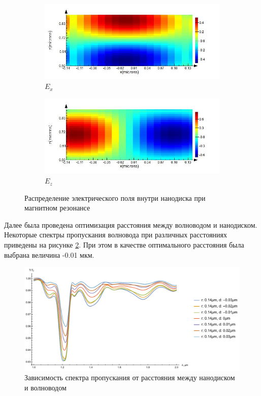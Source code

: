 \begin{figure}[H]
	\begin{subfigure}[b]{.5\textwidth}
		\includegraphics[width=\textwidth]{img/E_x_014}
		\caption{$E_x$}
	\end{subfigure}
	\begin{subfigure}[b]{.5\textwidth}
		\includegraphics[width=\textwidth]{img/E_z_014}
		\caption{$E_z$}
	\end{subfigure}
	\caption{Распределение электрического поля внутри нанодиска при магнитном резонансе}
	\label{fig:E_reson}
\end{figure}

Далее была проведена оптимизация расстояния между волноводом и нанодиском. Некоторые спектры пропускания волновода при различных расстояниях приведены на рисунке \ref{fig:1x_fixed_r}. При этом в качестве оптимального расстояния была выбрана величина -0.01 мкм.

\begin{figure}[h]
	\centering
	\includegraphics[width=.9\textwidth]{img/r_014_d_var}
	\caption{Зависимость спектра пропускания от расстояния между нанодиском и волноводом}
	\label{fig:1x_fixed_r}
\end{figure}

